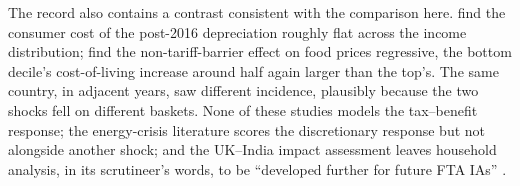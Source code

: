 The record also contains a contrast consistent with the comparison here. \citet{breinlich2022} find the consumer cost of the post-2016
depreciation roughly flat across the income distribution;
\citet{bakker2023, bakker2026} find the non-tariff-barrier effect on
food prices regressive, the bottom decile's cost-of-living increase
around half again larger than the top's. The same country, in adjacent
years, saw different incidence, plausibly because the two shocks fell on
different baskets. None of these studies models the tax--benefit response; the
energy-crisis literature scores the discretionary response but not
alongside another shock; and the UK--India impact assessment
\citep{dbtindia2026} leaves household analysis, in its scrutineer's
words, to be ``developed further for future FTA IAs''
\citep{rpc2025}.
